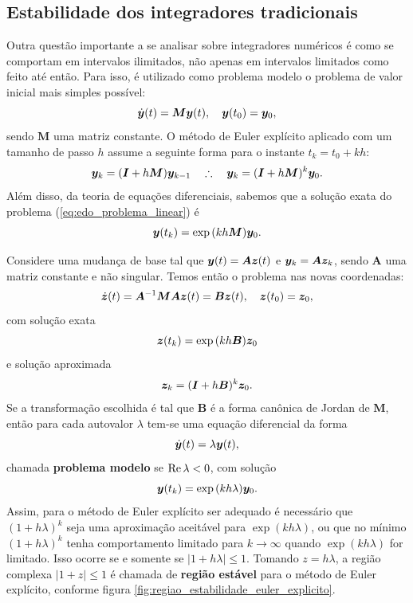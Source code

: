 \subsection{Estabilidade dos integradores tradicionais}
Outra questão importante a se analisar sobre integradores numéricos é como se comportam em intervalos ilimitados, não apenas em intervalos limitados como feito até então. Para isso, é utilizado como problema modelo o problema de valor inicial mais simples possível:
\begin{equation}\label{eq:edo_problema_linear}
    \dot {\bm y}(t) = \bm M \bm y(t), \quad \bm y(t_0) = \bm y_0,
\end{equation}
sendo $\bm M$ uma matriz constante. O método de Euler explícito aplicado com um tamanho de passo $h$ assume a seguinte forma para o instante $t_k = t_0 + k h$:
\begin{equation}\label{eq:edo_linear_aproximacao}
    \bm y_k = (\bm I + h \bm M) \bm y_{k-1}
    \quad
    \therefore
    \quad
    \bm y_k = (\bm I + h \bm M)^k \bm y_0.   
\end{equation}
Além disso, da teoria de equações diferenciais, sabemos que a solução exata do problema (\ref{eq:edo_problema_linear}) é
\begin{equation}\label{eq:edo_linear_solucao}
    \bm y(t_k) = \exp{(k h \bm M)} \bm y_0.
\end{equation}

Considere uma mudança de base tal que $\bm y(t) = \bm A \bm z(t)$ e $\bm y_k = \bm A \bm z_k$, sendo $\bm A$ uma matriz constante e não singular. Temos então o problema nas novas coordenadas:
\begin{equation}
    \dot {\bm z} (t) = \bm A^{-1} \bm M \bm A \bm z(t) = \bm B \bm z(t),
    \quad
    \bm z(t_0) = \bm z_0,
\end{equation}
com solução exata
\begin{equation}
    \bm z(t_k) = \exp{(k h \bm B)} \bm z_0
\end{equation}
e solução aproximada
\begin{equation}
    \bm z_k = (\bm I + h \bm B)^k \bm z_0.
\end{equation}
Se a transformação escolhida é tal que $\bm B$ é a forma canônica de Jordan de $\bm M$, então para cada autovalor $\lambda$ tem-se uma equação diferencial da forma
\begin{equation}
    \dot {\bm y}(t) = \lambda \bm y(t),
\end{equation}
chamada \textbf{problema modelo} se $\operatorname{\operatorname{Re}}{\lambda} < 0$, com solução
\begin{equation}
    \bm y(t_k) = \exp{(k h \lambda}) \bm y_0.
\end{equation}
Assim, para o método de Euler explícito ser adequado é necessário que $(1+ h \lambda)^k$ seja uma aproximação aceitável para $\exp{(k h \lambda)}$, ou que no mínimo $(1+h \lambda)^k$ tenha comportamento limitado para $k \to \infty$ quando $\exp{(k h \lambda)}$ for limitado. Isso ocorre se e somente se $|1 + h \lambda| \leq 1$. Tomando $z = h \lambda$, a região complexa $|1+z| \leq 1$ é chamada de \textbf{região estável} para o método de Euler explícito, conforme figura \ref{fig:regiao_estabilidade_euler_explicito}.

